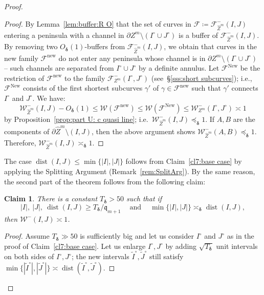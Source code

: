 \documentclass{amsart}
\renewcommand{\sp}{{\ \ }}
\newcommand{\1}{{\mathbb 1 }}
\newcommand{\Fam}{{\mathcal F}}
\newcommand{\Width}{{\mathcal W}}
\newcommand{\wZ}{{\widehat Z}}
\newcommand{\qq}{\mathfrak{q}}
\newcommand\new{{\operatorname{new}}}
\newcommand\New{{\operatorname{New}}}
\newtheorem{claim7}{Claim}
\theoremstyle{remark}
\numberwithin{equation}{section}
\theoremstyle{definition}
\newcommand{\dist}{\operatorname{dist}}
\newcommand{\bdelta}{{\boldsymbol{ \delta}}}
\begin{document}
\begin{proof}
\begin{proof}
By Lemma~\ref{lem:buffer:R O} that the set of curves in $\Fam\coloneqq \Fam_{\wZ^m}^-(I,J)$ entering a peninsula with a channel in $\partial Z^m\setminus (I^\circ \cup J^\circ)$ is a buffer of $\Fam_{\wZ^m}^-(I,J)$. By removing two $O_\bdelta (1)$-buffers from $\Fam_{\wZ^m}^-(I,J)$, we obtain that curves in the new family $\Fam^\new$ do not enter any peninsula whose channel is in $\partial Z^m\setminus (I^\circ \cup J^\circ)$ -- such channels are separated from $I^\circ\cup J^\circ$ by a definite  annulus. Let $\Fam^\New$ be the restriction of $\Fam^\new$ to the family $\Fam^-_{Z^m}(I^\circ, J^\circ)$ (see~\S\ref{sss:short subcurves}); i.e., $\Fam^\New$ consists of the first shortest subcurves $\gamma'$ of $\gamma\in \Fam^\new$ such that $\gamma'$ connects $I^\circ$ and $J^\circ$. We have:
\[\Width^-_{\wZ^m}(I,J)-O_\bdelta(1)\le \Width(\Fam^\new) \le \Width(\Fam^\New)\le \Width^-_{Z^m}(I^\circ,J^\circ ) \asymp 1   \]
by Proposition~\ref{prop:part U: c quasi line}; i.e.~$\Width^-_{\wZ^m}(I,J)\preceq_\bdelta 1$. If $A,B$ are the components of $\partial \wZ^m\setminus (I,J)$, then the above argument shows $\Width^-_{\wZ^m}(A,B)\preceq_\bdelta 1$. Therefore, $\Width^-_{\wZ^m}(I,J)\asymp_\bdelta 1$.
\end{proof}

The case $\dist (I,J)\le \min\{|I|,|J|\}$ follows from Claim~\ref{cl7:base case} by applying the Splitting Argument (Remark~\ref{rem:SplitArg}). By the same reason, the second part of the theorem follows from the following claim:

\begin{claim7}
\label{cl7:LS case}
There is a constant $T_\bdelta>50$ such that
if \[|I|,\ |J|,\ \dist(I,J) \ge T_\bdelta/\qq_{m+1} \sp\sp\text{ and }\sp\sp\min\{|I|,|J|\}\asymp_\bdelta \dist(I,J),\] then $\Width^-(I,J)\asymp 1$.
\end{claim7}
\begin{proof}
Assume $T_\bdelta\gg 50$ is sufficiently big and let us consider $I^\circ$ and $J^\circ$ as in the proof of Claim~\ref{cl7:base case}. Let us enlarge $I^\circ,J^\circ$ by adding $\sqrt{T_\bdelta}$ unit intervals on both sides of $I^\circ, J^\circ$; the new intervals $\widetilde I^\circ, \widetilde J^\circ$ still satisfy $\min\{|\widetilde I^\circ|, |\widetilde J^\circ| \}\asymp \dist(\widetilde I^\circ,\widetilde J^\circ)$.





\end{proof}
\end{proof}
\end{document}
